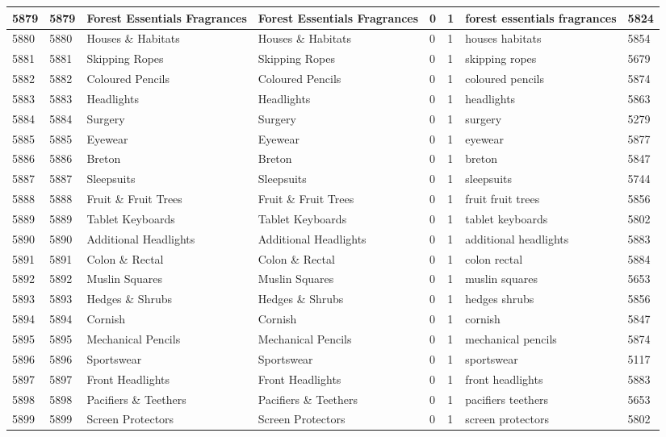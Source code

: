 \begin{longtable}{|l|l|l|l|l|l|l|l|}
5879 & 5879 & Forest Essentials Fragrances & Forest Essentials Fragrances & 0 & 1 & forest essentials fragrances & 5824 \\ \hline 
5880 & 5880 & Houses \& Habitats & Houses \& Habitats & 0 & 1 & houses habitats & 5854 \\ \hline 
5881 & 5881 & Skipping Ropes & Skipping Ropes & 0 & 1 & skipping ropes & 5679 \\ \hline 
5882 & 5882 & Coloured Pencils & Coloured Pencils & 0 & 1 & coloured pencils & 5874 \\ \hline 
5883 & 5883 & Headlights & Headlights & 0 & 1 & headlights & 5863 \\ \hline 
5884 & 5884 & Surgery & Surgery & 0 & 1 & surgery & 5279 \\ \hline 
5885 & 5885 & Eyewear & Eyewear & 0 & 1 & eyewear & 5877 \\ \hline 
5886 & 5886 & Breton & Breton & 0 & 1 & breton & 5847 \\ \hline 
5887 & 5887 & Sleepsuits & Sleepsuits & 0 & 1 & sleepsuits & 5744 \\ \hline 
5888 & 5888 & Fruit \& Fruit Trees & Fruit \& Fruit Trees & 0 & 1 & fruit fruit trees & 5856 \\ \hline 
5889 & 5889 & Tablet Keyboards & Tablet Keyboards & 0 & 1 & tablet keyboards & 5802 \\ \hline 
5890 & 5890 & Additional Headlights & Additional Headlights & 0 & 1 & additional headlights & 5883 \\ \hline 
5891 & 5891 & Colon \& Rectal & Colon \& Rectal & 0 & 1 & colon rectal & 5884 \\ \hline 
5892 & 5892 & Muslin Squares & Muslin Squares & 0 & 1 & muslin squares & 5653 \\ \hline 
5893 & 5893 & Hedges \& Shrubs & Hedges \& Shrubs & 0 & 1 & hedges shrubs & 5856 \\ \hline 
5894 & 5894 & Cornish & Cornish & 0 & 1 & cornish & 5847 \\ \hline 
5895 & 5895 & Mechanical Pencils & Mechanical Pencils & 0 & 1 & mechanical pencils & 5874 \\ \hline 
5896 & 5896 & Sportswear & Sportswear & 0 & 1 & sportswear & 5117 \\ \hline 
5897 & 5897 & Front Headlights & Front Headlights & 0 & 1 & front headlights & 5883 \\ \hline 
5898 & 5898 & Pacifiers \& Teethers & Pacifiers \& Teethers & 0 & 1 & pacifiers teethers & 5653 \\ \hline 
5899 & 5899 & Screen Protectors & Screen Protectors & 0 & 1 & screen protectors & 5802 \\ \hline 

\end{longtable}
